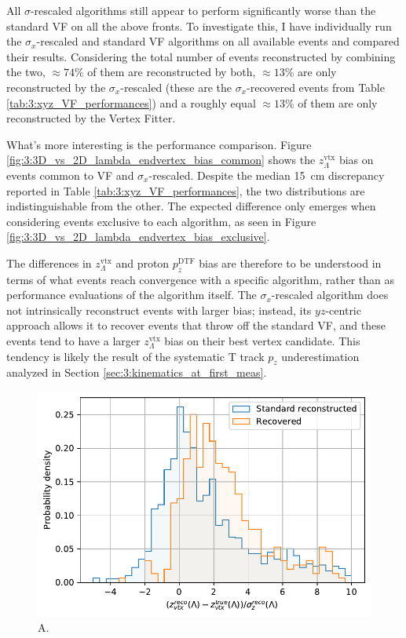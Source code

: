 All $\sigma$-rescaled algorithms still appear to perform significantly worse than the standard VF on all the above fronts.
To investigate this, I have individually run the $\sigma_x$-rescaled and standard VF algorithms on all available events and compared their results.
Considering the total number of events reconstructed by combining the two, $\approx 74\%$ of them are reconstructed by both, $\approx 13\%$ are only reconstructed by the $\sigma_x$-rescaled (these are the $\sigma_x$-recovered events from Table \ref{tab:3:xyz_VF_performances}) and a roughly equal $\approx 13\%$ of them are only reconstructed by the Vertex Fitter.

What's more interesting is the performance comparison. Figure \ref{fig:3:3D_vs_2D_lambda_endvertex_bias_common} shows the $z_\Lambda^\text{vtx}$ bias on events common to VF and $\sigma_x$-rescaled.
Despite the median \SI{15}{\centi\meter} discrepancy reported in Table \ref{tab:3:xyz_VF_performances}, the two distributions are indistinguishable from the other.
The expected difference only emerges when considering events exclusive to each algorithm, as seen in Figure \ref{fig:3:3D_vs_2D_lambda_endvertex_bias_exclusive}.

The differences in $z_\Lambda^\text{vtx}$ and proton $p_z^\text{DTF}$ bias are therefore to be understood in terms of what events reach convergence with a specific algorithm, rather than as performance evaluations of the algorithm itself.
The $\sigma_x$-rescaled algorithm does not intrinsically reconstruct events with larger bias;
instead, its $yz$-centric approach allows it to recover events that throw off the standard VF, and these events tend to have a larger $z_\Lambda^\text{vtx}$ bias on their best vertex candidate.
This tendency is likely the result of the systematic T track $p_z$ underestimation analyzed in Section \ref{sec:3:kinematics_at_first_meas}.

\begin{figure}[t]
	\centering
	\includegraphics[width=.6\textwidth]{graphics/03-vertex_reconstruction/xyz_L_ENDVERTEX_residual_2Dv3D_z_rel.pdf}
	\caption{A.}
	\label{fig:3:xyz_L_ENDVERTEX_residual_2Dv3D_z_rel}
\end{figure}

